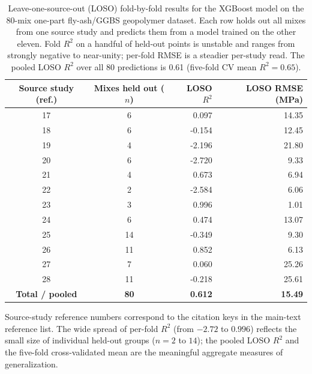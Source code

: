\documentclass[11pt]{article}
\begin{document}
\begin{table}[h]
\centering
\caption{Leave-one-source-out (LOSO) fold-by-fold results for the XGBoost model on
the 80-mix one-part fly-ash/GGBS geopolymer dataset. Each row holds out all mixes
from one source study and predicts them from a model trained on the other eleven.
Fold $R^2$ on a handful of held-out points is unstable and ranges from strongly
negative to near-unity; per-fold RMSE is a steadier per-study read. The pooled LOSO
$R^2$ over all 80 predictions is 0.61 (five-fold CV mean $R^2 = 0.65$).}
\label{tab:s2}
\begin{tabular}{ccrr}
\toprule
\textbf{Source study (ref.)} & \textbf{Mixes held out ($n$)} & \textbf{LOSO $R^2$} & \textbf{LOSO RMSE (MPa)} \\
\midrule
17 & 6  & 0.097  & 14.35 \\
18 & 6  & -0.154 & 12.45 \\
19 & 4  & -2.196 & 21.80 \\
20 & 6  & -2.720 & 9.33 \\
21 & 4  & 0.673  & 6.94 \\
22 & 2  & -2.584 & 6.06 \\
23 & 3  & 0.996  & 1.01 \\
24 & 6  & 0.474  & 13.07 \\
25 & 14 & -0.349 & 9.30 \\
26 & 11 & 0.852  & 6.13 \\
27 & 7  & 0.060  & 25.26 \\
28 & 11 & -0.218 & 25.61 \\
\midrule
\textbf{Total / pooled} & \textbf{80} & \bfseries 0.612 & \bfseries 15.49 \\
\bottomrule
\end{tabular}
\end{table}

Source-study reference numbers correspond to the citation keys in the main-text
reference list. The wide spread of per-fold $R^2$ (from $-2.72$ to $0.996$) reflects
the small size of individual held-out groups ($n = 2$ to $14$); the pooled LOSO
$R^2$ and the five-fold cross-validated mean are the meaningful aggregate measures
of generalization.
\end{document}
